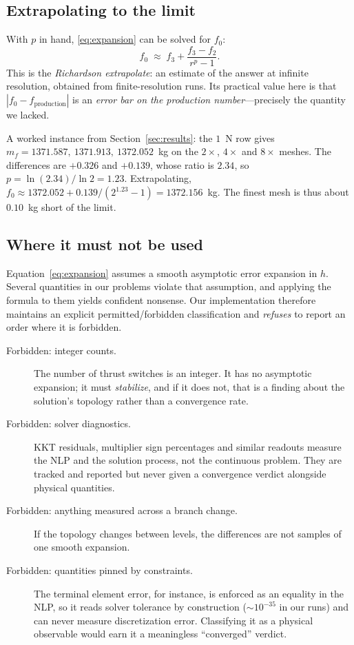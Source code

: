 \documentclass[11pt]{article}
\newcommand{\mf}{m_f}
\begin{document}
\subsection{Extrapolating to the limit}

With $p$ in hand, \eqref{eq:expansion} can be solved for $f_0$:
\begin{equation}
  f_0 \;\approx\; f_3 + \frac{f_3 - f_2}{r^{p} - 1}.
  \label{eq:richardson}
\end{equation}
This is the \emph{Richardson extrapolate}: an estimate of the answer at
infinite resolution, obtained from finite-resolution runs. Its practical value
here is that $|f_0 - f_{\text{production}}|$ is an \emph{error bar on the
production number}---precisely the quantity we lacked.

A worked instance from Section~\ref{sec:results}: the $1$~N row gives
$\mf = 1371.587,\ 1371.913,\ 1372.052$~kg on the $2\times$, $4\times$ and
$8\times$ meshes. The differences are $+0.326$ and $+0.139$, whose ratio is
$2.34$, so $p = \ln(2.34)/\ln 2 = 1.23$. Extrapolating,
$f_0 \approx 1372.052 + 0.139/(2^{1.23}-1) = 1372.156$~kg. The finest mesh is
thus about $0.10$~kg short of the limit.

\subsection{Where it must not be used}
\label{sec:richardson-limits}

Equation~\eqref{eq:expansion} assumes a smooth asymptotic error expansion in
$h$. Several quantities in our problems violate that assumption, and applying
the formula to them yields confident nonsense. Our implementation therefore
maintains an explicit permitted/forbidden classification and \emph{refuses} to
report an order where it is forbidden.

\begin{description}
  \item[Forbidden: integer counts.] The number of thrust switches is an
  integer. It has no asymptotic expansion; it must \emph{stabilize}, and if it
  does not, that is a finding about the solution's topology rather than a
  convergence rate.
  \item[Forbidden: solver diagnostics.] KKT residuals, multiplier sign
  percentages and similar readouts measure the NLP and the solution process,
  not the continuous problem. They are tracked and reported but never given a
  convergence verdict alongside physical quantities.
  \item[Forbidden: anything measured across a branch change.] If the topology
  changes between levels, the differences are not samples of one smooth
  expansion.
  \item[Forbidden: quantities pinned by constraints.] The terminal element
  error, for instance, is enforced as an equality in the NLP, so it reads
  solver tolerance by construction ($\sim 10^{-35}$ in our runs) and can never
  measure discretization error. Classifying it as a physical observable would
  earn it a meaningless ``converged'' verdict.
\end{description}
\end{document}

